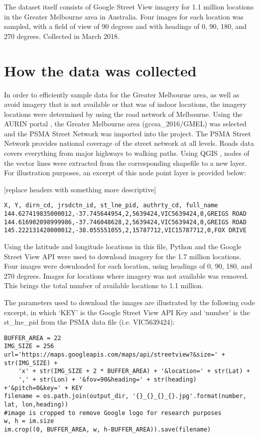 \documentclass[final,3p,times,authoryear]{elsarticle}
\begin{document}
The dataset itself consists of Google Street View imagery for 1.1 million locations in the Greater Melbourne area in Australia. Four images for each location was sampled, with a field of view of 90 degrees and with headings of 0, 90, 180, and 270 degrees. Collected in March 2018.

\section{How the data was collected}\label{sec:create}
In order to efficiently sample data for the Greater Melbourne area, as well as avoid imagery that is not available or that was of indoor locations, the imagery locations were determined by using the road network of Melbourne. Using the AURIN portal \citep{Aurin2018}, the Greater Melbourne area (gccsa\_2016/GMEL) was selected and the PSMA Street Network \citep{PSMA2018} was imported into the project. The PSMA Street Network provides national coverage of the street network at all levels. Roads data covers everything from major highways to walking paths. Using QGIS \citep{QGIS2009}, nodes of the vector lines were extracted from the corresponding shapefile to a new layer. For illustration purposes, an excerpt of this node point layer is provided below:

[replace headers with something more descriptive]
\begin{verbatim}
X, Y, dirn_cd, jrsdctn_id, st_lne_pid, authrty_cd, full_name
144.627419835000012,-37.745644954,2,5639424,VIC5639424,0,GREIGS ROAD
144.616902098999986,-37.746048628,2,5639424,VIC5639424,0,GREIGS ROAD
145.222131428000012,-38.055551055,2,15787712,VIC15787712,0,FOX DRIVE
\end{verbatim}

Using the latitude and longitude locations in this file, Python and the Google Street View API \citep{GoogleMaps2017b} were used to download imagery for the 1.7 million locations. Four images were downloaded for each location, using headings of 0, 90, 180, and 270 degrees. Images for locations where imagery was not available was removed. This brings the total number of available locations to 1.1 million.

The parameters used to download the images are illustrated by the following code excerpt, in which `KEY' is the Google Street View API Key and `number' is the st\_lne\_pid from the PSMA data file (i.e. VIC5639424):

\begin{verbatim}
BUFFER_AREA = 22
IMG_SIZE = 256
url='https://maps.googleapis.com/maps/api/streetview?&size=' + str(IMG_SIZE) +
    'x' + str(IMG_SIZE + 2 * BUFFER_AREA) + '&location=' + str(Lat) +
    ',' + str(Lon) + '&fov=90&heading=' + str(heading) +'&pitch=0&key=' + KEY         
filename = os.path.join(output_dir, '{}_{}_{}_{}.jpg'.format(number, lat, lon,heading))
#image is cropped to remove Google logo for research purposes
w, h = im.size
im.crop((0, BUFFER_AREA, w, h-BUFFER_AREA)).save(filename)
\end{verbatim}
\end{document}

